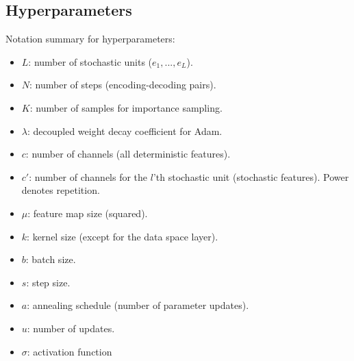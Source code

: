 \documentclass{article}
\begin{document}
\subsection{Hyperparameters}
\label{app:hparam}
{Notation summary for hyperparameters:}
\vspace{-3mm}
\begin{itemize}\setlength\itemsep{0.0em}
\item $L$: number of stochastic units ($e_1,...,e_L$).
\item $N$: number of steps (encoding-decoding pairs).
\item $K$: number of samples for importance sampling.
\item $\lambda$: decoupled weight decay coefficient for Adam.
\item $c$: number of channels (all deterministic features). 
\item $c'$: number of channels for the $l$'th stochastic unit (stochastic features). 
Power denotes repetition.   
\item $\mu$: feature map size (squared).  
\item $k$: kernel size (except for the data space layer). 
\item $b$: batch size. 
\item $s$: step size.
\item $a$: annealing schedule (number of parameter updates).
\item $u$: number of updates.
\item $\sigma$: activation function
\end{itemize}
\end{document}
